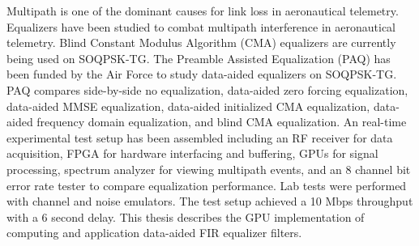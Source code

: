 Multipath is one of the dominant causes for link loss in aeronautical telemetry.
Equalizers have been studied to combat multipath interference in aeronautical telemetry.
Blind Constant Modulus Algorithm (CMA) equalizers are currently being used on SOQPSK-TG.
The Preamble Assisted Equalization (PAQ) has been funded by the Air Force to study data-aided equalizers on SOQPSK-TG.
PAQ compares side-by-side no equalization, data-aided zero forcing equalization, data-aided MMSE equalization, data-aided initialized CMA equalization, data-aided frequency domain equalization, and blind CMA equalization.
An real-time experimental test setup has been assembled including an RF receiver for data acquisition, FPGA for hardware interfacing and buffering, GPUs for signal processing, spectrum analyzer for viewing multipath events, and an 8 channel bit error rate tester to compare equalization performance. 
Lab tests were performed with channel and noise emulators.
The test setup achieved a 10 Mbps throughput with a 6 second delay.
This thesis describes the GPU implementation of computing and application data-aided FIR equalizer filters.
